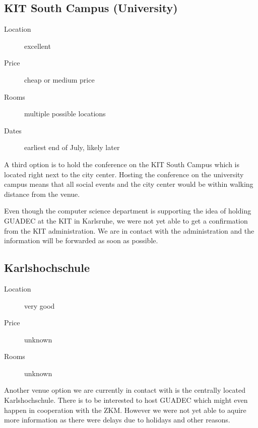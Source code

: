 \vspace*{6cm}

\subsection{KIT South Campus (University)}%

\begin{description}
\item[Location] excellent
\item[Price] cheap or medium price
\item[Rooms] multiple possible locations
\item[Dates] earliest end of July, likely later
\end{description}

A third option is to hold the conference on the KIT South Campus which is
located right next to the city center. Hosting the conference on the university
campus means that all social events and the city center would be within walking
distance from the venue.

Even though the computer science department is supporting the idea of holding
GUADEC at the KIT in Karlsruhe, we were not yet able to get a confirmation from
the KIT administration. We are in contact with the administration and the
information will be forwarded as soon as possible.

\subsection{Karlshochschule}
\begin{description}
\item[Location] very good
\item[Price] unknown
\item[Rooms] unknown
\end{description}

Another venue option we are currently in contact with is the centrally
located Karlshochschule. There is to be interested to host GUADEC which
might even happen in cooperation with the ZKM. However we were not yet able
to aquire more information as there were delays due to holidays and other reasons.

